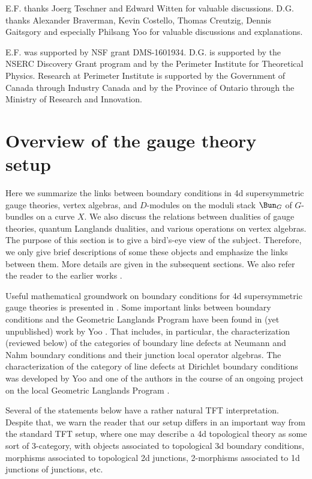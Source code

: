 \documentclass[11pt,reqno]{amsart}
\theoremstyle{plain}
\numberwithin{equation}{section}
\theoremstyle{definition}
\begin{document}
\bigskip

 E.F. thanks Joerg Teschner and
Edward Witten for valuable discussions.  D.G. thanks Alexander
Braverman, Kevin Costello, Thomas Creutzig, Dennis Gaitsgory and
especially Philsang Yoo for valuable discussions and explanations.

E.F. was supported by NSF grant DMS-1601934. D.G. is supported by the
NSERC Discovery Grant program and by the Perimeter Institute for
Theoretical Physics. Research at Perimeter Institute is supported by
the Government of Canada through Industry Canada and by the Province
of Ontario through the Ministry of Research and Innovation.

\section{Overview of the gauge theory setup}    \label{overview}

Here we summarize the links between boundary conditions in 4d
supersymmetric gauge theories, vertex algebras, and $D$-modules on the
moduli stack $\Bun_G$ of $G$-bundles on a curve $X$.  We also discuss
the relations between dualities of gauge theories, quantum Langlands
dualities, and various operations on vertex algebras. The purpose of
this section is to give a bird's-eye view of the
subject. Therefore, we only give brief descriptions of some these
objects and emphasize the links between them. More details are given
in the subsequent sections. We also refer the reader to the earlier
works \cite{GW1,GW2,Ga1,Ga2,GR,CG}. 

Useful mathematical groundwork on boundary conditions for 4d
supersymmetric gauge theories is presented in \cite{EY,BY}. Some
important links between boundary conditions and the Geometric
Langlands Program have been found in (yet unpublished) work by Yoo
\cite{Y:Perimeter}.  That includes, in particular, the
characterization (reviewed below) of the categories of boundary line
defects at Neumann and Nahm boundary conditions and their junction
local operator algebras. The characterization of the category of line
defects at Dirichlet boundary conditions was developed by Yoo and one
of the authors in the course of an ongoing project on the local
Geometric Langlands Program \cite{GY}.

Several of the statements below have a rather natural TFT
interpretation. Despite that, we warn the reader that our setup
differs in an important way from the standard TFT setup, where one may
describe a 4d topological theory as some sort of 3-category, with
objects associated to topological 3d boundary conditions, morphisms
associated to topological 2d junctions, 2-morphisms associated to 1d
junctions of junctions, etc.
\end{document}
